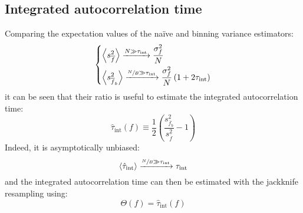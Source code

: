 \subsection*{Integrated autocorrelation time}
Comparing the expectation values of the na\"ive and binning variance estimators:
\[\begin{dcases}
    \left<s_{\overline f}^2\right> \xrightarrow{N\gg\tau_\mathrm{int}} \frac{\sigma_f^2}{N} \\
    \left<s_{\overline f_b}^2\right> \xrightarrow{\sfrac{N}{B}\gg\tau_\mathrm{int}} \frac{\sigma_f^2}{N}\left(1+2\tau_\mathrm{int}\right)
\end{dcases}\]
it can be seen that their ratio is useful to estimate the integrated autocorrelation time:
\[
    \hat\tau_\mathrm{int}(f) \equiv \frac{1}{2}\left(\frac{s_{\overline f_b}^2}{s_{\overline f}^2}-1\right) 
\]
Indeed, it is asymptotically unbiased:
\[
    \left<\hat\tau_\mathrm{int}\right> \xrightarrow{\sfrac{N}{B}\gg\tau_\mathrm{int}} \tau_\mathrm{int}
\]
and the integrated autocorrelation time can then be estimated with the jackknife resampling using:
\[
    \Theta(f) = \hat\tau_\mathrm{int}(f)
\]


